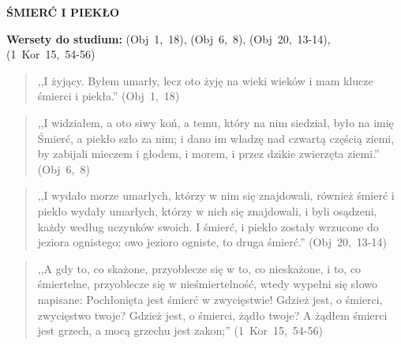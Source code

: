 \documentclass[10pt,a4paper,oneside]{article}
\begin{document}
\centerline{\textbf{\MakeUppercase{Śmierć i Piekło}}}
\begin{center}
\textbf{Wersety do studium:} \mbox{(Obj 1, 18)}, \mbox{(Obj 6, 8)}, \mbox{(Obj 20, 13-14)}, \mbox{(1 Kor 15, 54-56)}
\end{center}
\begin{quote}
,,I żyjący. Byłem umarły, lecz oto żyję na wieki wieków i mam klucze śmierci i piekła.'' \mbox{(Obj 1, 18)}
\end{quote}
\begin{quote}
,,I widziałem, a oto siwy koń, a temu, który na nim siedział, było na imię Śmierć, a piekło szło za nim; i dano im władzę nad czwartą częścią ziemi, by zabijali mieczem i głodem, i morem, i przez dzikie zwierzęta ziemi.'' \mbox{(Obj 6, 8)}
\end{quote}
\begin{quote}
,,I wydało morze umarłych, którzy w nim się znajdowali, również śmierć i piekło wydały umarłych, którzy w nich się znajdowali, i byli osądzeni, każdy według uczynków swoich. I śmierć, i piekło zostały wrzucone do jeziora ognistego; owo jezioro ogniste, to druga śmierć.'' \mbox{(Obj 20, 13-14)}
\end{quote}
\begin{quote}
,,A gdy to, co skażone, przyoblecze się w to, co nieskażone, i to, co śmiertelne, przyoblecze się w nieśmiertelność, wtedy wypełni się słowo napisane: Pochłonięta jest śmierć w zwycięstwie! Gdzież jest, o śmierci, zwycięstwo twoje? Gdzież jest, o śmierci, żądło twoje? A żądłem śmierci jest grzech, a mocą grzechu jest zakon;'' \mbox{(1 Kor 15, 54-56)}
\end{quote}
\end{document}

